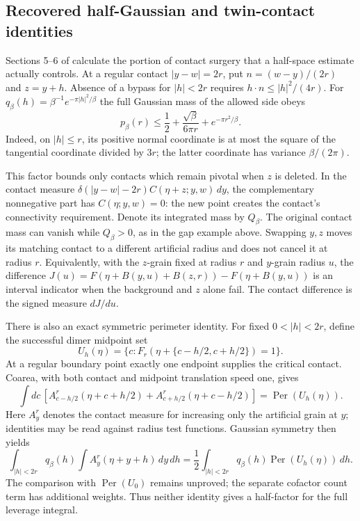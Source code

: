 \documentclass[11pt,a4paper]{article}
\theoremstyle{definition}
\theoremstyle{remark}
\numberwithin{equation}{section}
\begin{document}
\subsection{Recovered half-Gaussian and twin-contact identities}
\label{br:contact-refinements}

Sections 5--6 of 
calculate the portion of contact surgery that a half-space estimate
actually controls. At a regular contact $|y-w|=2r$, put
$n=(w-y)/(2r)$ and $z=y+h$. Absence of a bypass for $|h|<2r$
requires $h\cdot n\le |h|^2/(4r)$. For
$q_\beta(h)=\beta^{-1}e^{-\pi|h|^2/\beta}$ the full Gaussian mass
of the allowed side obeys
\[
 p_\beta(r)\le\frac12+\frac{\sqrt\beta}{6\pi r}
                         +e^{-\pi r^2/\beta}.
\]
Indeed, on $|h|\le r$, its positive normal coordinate is at most
the square of the tangential coordinate divided by $3r$; the latter
coordinate has variance $\beta/(2\pi)$.

This factor bounds only contacts which remain pivotal when $z$ is
deleted. In the contact measure
$\delta(|y-w|-2r)C(\eta+z;y,w)\,dy$, the complementary nonnegative
part has $C(\eta;y,w)=0$: the new point creates the contact's
connectivity requirement. Denote its integrated mass by $Q_\beta$.
The original contact mass can vanish while $Q_\beta>0$, as in the
gap example above. Swapping $y,z$ moves its matching contact to a
different artificial radius and does not cancel it at radius $r$.
Equivalently, with the $z$-grain fixed at radius $r$ and $y$-grain
radius $u$, the difference
$J(u)=F(\eta+B(y,u)+B(z,r))-F(\eta+B(y,u))$
is an interval indicator when the background and $z$ alone fail.
The contact difference is the signed measure $dJ/du$.

There is also an exact symmetric perimeter identity. For fixed
$0<|h|<2r$, define the successful dimer midpoint set
\[
 U_h(\eta)=\{c:F_r(\eta+\{c-h/2,c+h/2\})=1\}.
\]
At a regular boundary point exactly one endpoint supplies the
critical contact. Coarea, with both contact and midpoint translation
speed one, gives
\[
 \int dc\,[A_{c-h/2}^r(\eta+c+h/2)
               +A_{c+h/2}^r(\eta+c-h/2)]
       =\operatorname{Per}(U_h(\eta)).
\]
Here $A_y^r$ denotes the contact measure for increasing only the
artificial grain at $y$; identities may be read against radius test
functions. Gaussian symmetry then yields
\[
 \int_{|h|<2r}q_\beta(h)\int A_y^r(\eta+y+h)\,dy\,dh
 =\frac12\int_{|h|<2r}q_\beta(h)
                           \operatorname{Per}(U_h(\eta))\,dh.
\]
The comparison with $\operatorname{Per}(U_0)$ remains unproved;
the separate cofactor count term has additional weights. Thus neither
identity gives a half-factor for the full leverage integral.
\end{document}
